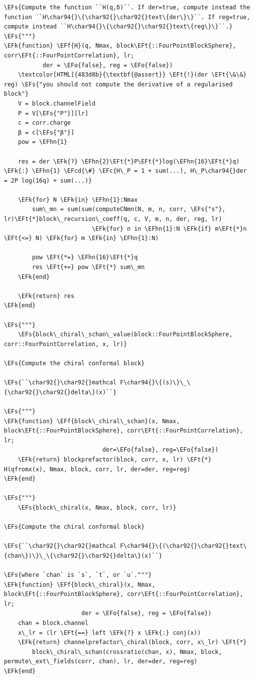 \documentclass[a4paper]{article}
\numberwithin{equation}{section}
\newcommand{\EFc}[1]{\textcolor{EFc}{#1}} %
\newcommand{\EFcd}[1]{\textcolor{EFcd}{#1}} %
\newcommand{\EFs}[1]{\textcolor{EFs}{#1}} %
\newcommand{\EFk}[1]{\textcolor{EFk}{#1}} %
\newcommand{\EFf}[1]{\textcolor{EFf}{#1}} %
\newcommand{\EFt}[1]{\textcolor{EFt}{#1}} %
\newcommand{\EFo}[1]{\textcolor{EFo}{#1}} %
\newcommand{\EFhn}[1]{\textcolor{EFhn}{#1}} %
\begin{document}
\begin{Code}
\begin{Verbatim}
\EFs{Compute the function ``H(q,δ)``. If der=true, compute instead the function ``H\char94{}\{\char92{}\char92{}text\{der\}\}``. If reg=true, compute instead ``H\char94{}\{\char92{}\char92{}text\{reg\}\}``.}
\EFs{"""}
\EFk{function} \EFf{H}(q, Nmax, block\EFt{::FourPointBlockSphere}, corr\EFt{::FourPointCorrelation}, lr;
           der = \EFo{false}, reg = \EFo{false})
    \textcolor[HTML]{483d8b}{\textbf{@assert}} \EFt{!}(der \EFt{\&\&} reg) \EFs{"you should not compute the derivative of a regularised block"}
    V = block.channelField
    P = V[\EFs{"P"}][lr]
    c = corr.charge
    β = c[\EFs{"β"}]
    pow = \EFhn{1}

    res = der \EFk{?} \EFhn{2}\EFt{*}P\EFt{*}log(\EFhn{16}\EFt{*}q) \EFk{:} \EFhn{1} \EFcd{\#} \EFc{H\_P = 1 + sum(...), H\_P\char94{}der = 2P log(16q) + sum(...)}

    \EFk{for} N \EFk{in} \EFhn{1}:Nmax
        sum\_mn = sum(sum(computeCNmn(N, m, n, corr, \EFs{"s"}, lr)\EFt{*}block\_recursion\_coeff(q, c, V, m, n, der, reg, lr)
                         \EFk{for} n in \EFhn{1}:N \EFk{if} m\EFt{*}n \EFt{<=} N) \EFk{for} m \EFk{in} \EFhn{1}:N)

        pow \EFt{*=} \EFhn{16}\EFt{*}q
        res \EFt{+=} pow \EFt{*} sum\_mn
    \EFk{end}

    \EFk{return} res
\EFk{end}

\EFs{"""}
    \EFs{block\_chiral\_schan\_value(block::FourPointBlockSphere, corr::FourPointCorrelation, x, lr)}

\EFs{Compute the chiral conformal block}

\EFs{``\char92{}\char92{}mathcal F\char94{}\{(s)\}\_\{\char92{}\char92{}delta\}(x)``}

\EFs{"""}
\EFk{function} \EFf{block\_chiral\_schan}(x, Nmax, block\EFt{::FourPointBlockSphere}, corr\EFt{::FourPointCorrelation}, lr;
                            der=\EFo{false}, reg=\EFo{false})
    \EFk{return} blockprefactor(block, corr, x, lr) \EFt{*} H(qfromx(x), Nmax, block, corr, lr, der=der, reg=reg)
\EFk{end}

\EFs{"""}
    \EFs{block\_chiral(x, Nmax, block, corr, lr)}

\EFs{Compute the chiral conformal block}

\EFs{``\char92{}\char92{}mathcal F\char94{}\{(\char92{}\char92{}text\{chan\})\}\_\{\char92{}\char92{}delta\}(x)``}

\EFs{where `chan` is `s`, `t`, or `u`."""}
\EFk{function} \EFf{block\_chiral}(x, Nmax, block\EFt{::FourPointBlockSphere}, corr\EFt{::FourPointCorrelation}, lr;
                      der = \EFo{false}, reg = \EFo{false})
    chan = block.channel
    x\_lr = (lr \EFt{==} left \EFk{?} x \EFk{:} conj(x))
    \EFk{return} channelprefactor\_chiral(block, corr, x\_lr) \EFt{*}
        block\_chiral\_schan(crossratio(chan, x), Nmax, block, permute\_ext\_fields(corr, chan), lr, der=der, reg=reg)
\EFk{end}


\end{Verbatim}
\end{Code}
\end{document}

